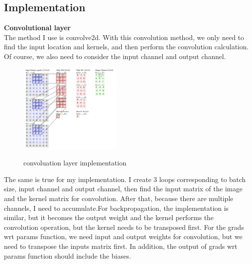 \documentclass{article}
\begin{document}
\subsection{Implementation}

\textbf{Convolutional layer}\\
The method I use is convolve2d. With this convolution method, we only need to find the input location and kernels, and then perform the convolution calculation. Of course, we also need to consider the input channel and output channel.
\begin{figure}[H] %
	\centering %
	\includegraphics[width=0.45\textwidth]{./pic/part1/cnlayerImp.png} %
	\caption{convoluation layer implementation} %
	\label{Fig.main2} %
	\cite{cs231n}
\end{figure}
The same is true for my implementation. I create 3 loops corresponding to batch  size, input channel and output channel, then find the input matrix of the image and the kernel matrix for convolution. After that, because there are multiple channels, I need to accumulate.For backpropagation, the implementation is similar, but it becomes the output weight and the kernel performs the convolution operation, but the kernel needs to be transposed first. For the grads wrt params function, we need input and output weights for convolution, but we need to transpose the inputs matrix first. In addition, the output of grads wrt params function should include the biases.\\
\end{document}
